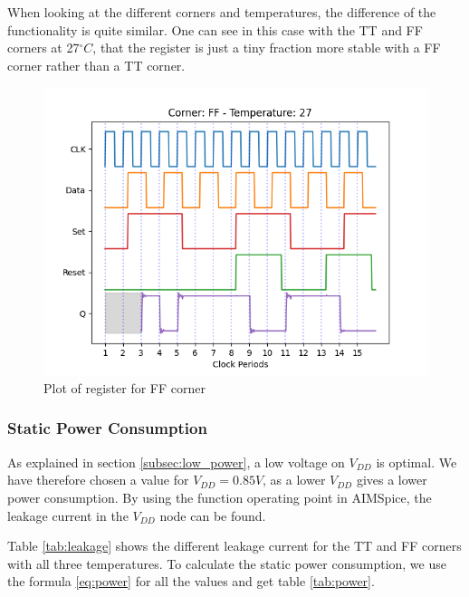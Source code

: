 When looking at the different corners and temperatures, the difference of the functionality is quite similar. One can see in this case with the TT and FF corners at 27$^\circ C$, that the register is just a tiny fraction more stable with a FF corner rather than a TT corner.

\begin{figure}[H]
    \centering
    \includegraphics[width=\textwidth]{Figures/Aimspice_Plots/FF_27.png}
    \caption{Plot of register for FF corner}
    \label{fig:result_FF27}
\end{figure}

\subsubsection{Static Power Consumption}

As explained in section \ref{subsec:low_power}, a low voltage on $V_{DD}$ is optimal. We have therefore chosen a value for $V_{DD} = 0.85V$, as a lower $V_{DD}$ gives a lower power consumption. By using the function operating point in AIMSpice, the leakage current in the $V_{DD}$ node can be found.

Table \ref{tab:leakage} shows the different leakage current for the TT and FF corners with all three temperatures. To calculate the static power consumption, we use the formula \ref{eq:power} for all the values and get table \ref{tab:power}.

